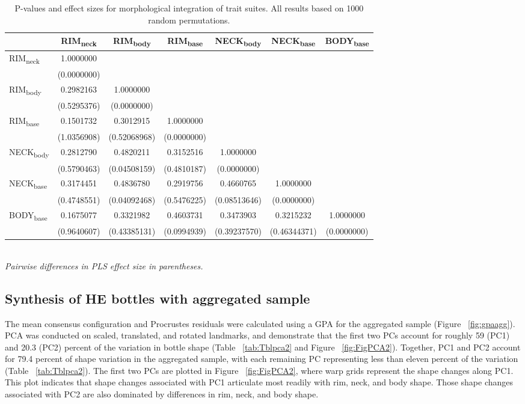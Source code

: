 \documentclass[review]{elsarticle}
\begin{document}
\begin{table}[htbp]\centering
\footnotesize
\caption{P-values and effect sizes for morphological integration of trait suites. All results based on 1000 random permutations.}
\centering
\begin{tabular}{lcccccc}
\toprule
 & RIM\textsubscript{neck} & RIM\textsubscript{body} & RIM\textsubscript{base} & NECK\textsubscript{body} & NECK\textsubscript{base} & BODY\textsubscript{base}\\
\midrule
RIM\textsubscript{neck} & 1.0000000 &  &  &  &  & \\
	   & (0.0000000) &  &  &  &  & \\
RIM\textsubscript{body} & 0.2982163 & 1.0000000 &  &  &  & \\
	   & (0.5295376) & (0.0000000) &  &  &  & \\
RIM\textsubscript{base} & 0.1501732 & 0.3012915 & 1.0000000 &  &  & \\
	   & (1.0356908) & (0.52068968) & (0.0000000) &  &  & \\
NECK\textsubscript{body} & 0.2812790 & 0.4820211 & 0.3152516 & 1.0000000 &  & \\
	   & (0.5790463) & (0.04508159) & (0.4810187) & (0.0000000) &  & \\
NECK\textsubscript{base} & 0.3174451 & 0.4836780 & 0.2919756 & 0.4660765 & 1.0000000 & \\
	   & (0.4748551) & (0.04092468) & (0.5476225) & (0.08513646) & (0.0000000) & \\
BODY\textsubscript{base} & 0.1675077 & 0.3321982 & 0.4603731 & 0.3473903 & 0.3215232 & 1.0000000\\
	   & (0.9640607) & (0.43385131) & (0.0994939) & (0.39237570) & (0.46344371) & (0.0000000)\\
\bottomrule
\end{tabular}\\
\smallskip
\textit{Pairwise differences in PLS effect size in parentheses.}\\
\label{tab:Tblmorphinteg}
\end{table}

\subsection{Synthesis of HE bottles with aggregated sample}

The mean consensus configuration and Procrustes residuals were calculated using a GPA for the aggregated sample (Figure ~\ref{fig:gpaagg}). PCA was conducted on scaled, translated, and rotated landmarks, and demonstrate that the first two PCs account for roughly 59 (PC1) and 20.3 (PC2) percent of the variation in bottle shape (Table ~\ref{tab:Tblpca2} and Figure ~\ref{fig:FigPCA2}). Together, PC1 and PC2 account for 79.4 percent of shape variation in the aggregated sample, with each remaining PC representing less than eleven percent of the variation (Table ~\ref{tab:Tblpca2}). The first two PCs are plotted in Figure ~\ref{fig:FigPCA2}, where warp grids represent the shape changes along PC1. This plot indicates that shape changes associated with PC1 articulate most readily with rim, neck, and body shape. Those shape changes associated with PC2 are also dominated by differences in rim, neck, and body shape.
\end{document}
